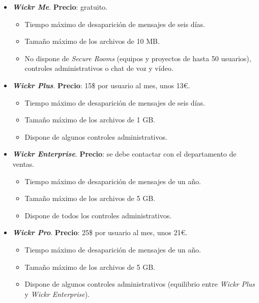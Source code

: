 \begin{itemize}
	\item \textbf{\textit{Wickr Me}}. \textbf{Precio}: gratuito.
	
	\begin{itemize}
		\item Tiempo máximo de desaparición de mensajes de seis días.
		\item Tamaño máximo de los archivos de 10 \acs{MB}.
		\item No dispone de \textit{Secure Rooms} (equipos y proyectos de hasta 50 usuarios), controles administrativos o chat de voz y vídeo.		
	\end{itemize}

	\newpage

	\item \textbf{\textit{Wickr Plus}}. \textbf{Precio}: 15\$ por usuario al mes, unos 13\euro{}.
	
	\begin{itemize}
		\item Tiempo máximo de desaparición de mensajes de seis días.
		\item Tamaño máximo de los archivos de 1 \acs{GB}.
		\item Dispone de algunos controles administrativos.
	\end{itemize}

	\item \textbf{\textit{Wickr Enterprise}}. \textbf{Precio}: se debe contactar con el departamento de ventas.

	\begin{itemize}
		\item Tiempo máximo de desaparición de mensajes de un año.
		\item Tamaño máximo de los archivos de 5 \acs{GB}.
		\item Dispone de todos los controles administrativos.
	\end{itemize}

	\item \textbf{\textit{Wickr Pro}}. \textbf{Precio}: 25\$ por usuario al mes, unos 21\euro{}.

	\begin{itemize}
		\item Tiempo máximo de desaparición de mensajes de un año.
		\item Tamaño máximo de los archivos de 5 \acs{GB}.
		\item Dispone de algunos controles administrativos (equilibrio entre \textit{Wickr Plus} y \textit{Wickr Enterprise}).
	\end{itemize}

\end{itemize}

